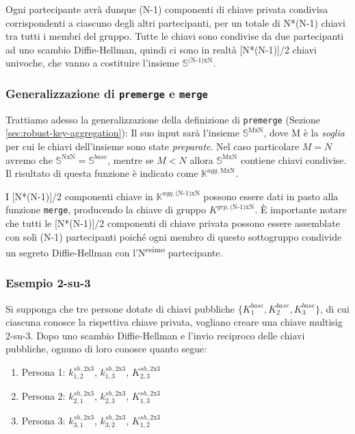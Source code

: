 Ogni partecipante avrà dunque (N-1) componenti di chiave privata condivisa corrispondenti a ciascuno degli altri partecipanti, per un totale di N*(N-1) chiavi tra tutti i membri del gruppo. Tutte le chiavi sono condivise da due partecipanti ad uno scambio Diffie-Hellman, quindi ci sono in realtà [N*(N-1)]/2 chiavi univoche, che vanno a costituire l'insieme $\mathbb{S}^{\textrm{(N-1)xN}}$.

\subsubsection*{Generalizzazione di {\tt premerge} e {\tt merge}}

Trattiamo adesso la generalizzazione della definizione di {\tt premerge} (Sezione \ref{sec:robust-key-aggregation}): Il suo input sarà l'insieme $\mathbb{S}^{\textrm{MxN}}$, dove M è la \emph{soglia} per cui le chiavi dell'insieme sono state \emph{preparate}. Nel caso particolare $M = N$ avremo che $\mathbb{S}^{\textrm{NxN}} = \mathbb{S}^{base}$, mentre se $M < N$ allora $\mathbb{S}^{\textrm{MxN}}$ contiene chiavi condivise. Il risultato di questa funzione è indicato come $\mathbb{K}^{agg,\textrm{MxN}}$.

I [N*(N-1)]/2 componenti chiave in $\mathbb{K}^{agg,\textrm{(N-1)xN}}$ possono essere dati in pasto alla funzione {\tt merge}, producendo la chiave di gruppo $K^{grp,\textrm{(N-1)xN}}$. È importante notare che tutti le [N*(N-1)]/2 componenti di chiave privata possono essere assemblate con soli (N-1) partecipanti poiché ogni membro di questo sottogruppo condivide un segreto Diffie-Hellman con l'N\textsuperscript{esimo} partecipante.

\subsubsection*{Esempio 2-su-3}

Si supponga che tre persone dotate di chiavi pubbliche $\{K^{base}_1,K^{base}_2,K^{base}_3\}$, di cui ciascuna conosce la rispettiva chiave privata, vogliano creare una chiave multisig 2-su-3. Dopo uno scambio Diffie-Hellman e l'invio reciproco delle chiavi pubbliche, ognuno di loro conosce quanto segue:
\begin{enumerate}
    \item Persona 1: $k^{sh,\textrm{2x3}}_{1,2}$, $k^{sh,\textrm{2x3}}_{1,3}$, $K^{sh,\textrm{2x3}}_{2,3}$
    \item Persona 2: $k^{sh,\textrm{2x3}}_{2,1}$, $k^{sh,\textrm{2x3}}_{2,3}$, $K^{sh,\textrm{2x3}}_{1,3}$
    \item Persona 3: $k^{sh,\textrm{2x3}}_{3,1}$, $k^{sh,\textrm{2x3}}_{3,2}$, $K^{sh,\textrm{2x3}}_{1,2}$
\end{enumerate}

